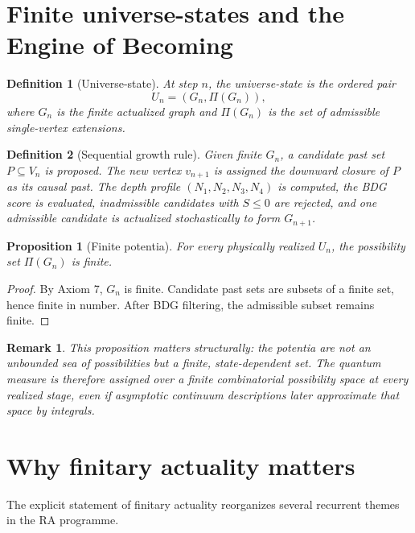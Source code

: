 \documentclass[11pt]{article}
\newtheorem{definition}{Definition}
\newtheorem{proposition}{Proposition}
\newtheorem{remark}{Remark}
\newcommand{\Pot}{\Pi}
\begin{document}
\section{Finite universe-states and the Engine of Becoming}
\begin{definition}[Universe-state]
At step $n$, the universe-state is the ordered pair
\[
U_n=(G_n,\Pot(G_n)),
\]
where $G_n$ is the finite actualized graph and $\Pot(G_n)$ is the set of admissible single-vertex extensions.
\end{definition}

\begin{definition}[Sequential growth rule]
Given finite $G_n$, a candidate past set $P\subseteq V_n$ is proposed. The new vertex $v_{n+1}$ is assigned the downward closure of $P$ as its causal past. The depth profile $(N_1,N_2,N_3,N_4)$ is computed, the BDG score is evaluated, inadmissible candidates with $S\le 0$ are rejected, and one admissible candidate is actualized stochastically to form $G_{n+1}$.
\end{definition}

\begin{proposition}[Finite potentia]
For every physically realized $U_n$, the possibility set $\Pot(G_n)$ is finite.
\end{proposition}

\begin{proof}
By Axiom 7, $G_n$ is finite. Candidate past sets are subsets of a finite set, hence finite in number. After BDG filtering, the admissible subset remains finite.
\end{proof}

\begin{remark}
This proposition matters structurally: the potentia are not an unbounded sea of possibilities but a finite, state-dependent set. The quantum measure is therefore assigned over a finite combinatorial possibility space at every realized stage, even if asymptotic continuum descriptions later approximate that space by integrals.
\end{remark}

\section{Why finitary actuality matters}
The explicit statement of finitary actuality reorganizes several recurrent themes in the RA programme.
\end{document}
